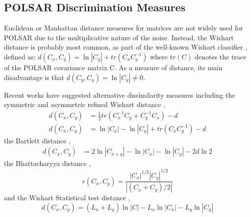 \documentclass[]{tRSL2e}
\begin{document}
\subsection{POLSAR Discrimination Measures}
\label{sec:lit_measures}

Euclidean or Manhattan distance measures for matrices are not widely used 
for POLSAR due to the multiplicative nature of the noise.
Instead, the Wishart distance is probably most common, as part of the well-known Wishart classifier \citep{Lee_1999_TGRS}, defined \citep{Lee_1994_IJRS_2299} as:
$d(C_x,C_y) = \ln|C_y| + tr(C_xC_y^{-1})$
where $tr(C)$ denotes the trace of the POLSAR covariance matrix C. 
As a measure of distance, its main disadvantage is that $d(C_y,C_y) = \ln|C_y| \neq 0$.

Recent works have suggested alternative dissimilarity measures including the symmetric and asymmetric refined Wishart distance \citep{Anfinsen_2007_ESA_POLINSAR},
\vspace{-2mm}
\begin{align}
  d(C_x,C_y) &= \frac{1}{2} tr(C_x^{-1}C_y + C_y^{-1}C_x) - d \\
    d(C_x,C_y) &= \ln|C_x| - \ln|C_y| + tr(C_xC_y^{-1}) - d
\end{align}
\vspace{-2mm}
the Bartlett distance \citep{Kersten_2005_TGRS_519},
     \vspace{-2mm}
  \begin{align}
  d(C_x,C_y) &= 2 \ln |C_{x+y}| - \ln |C_x| - \ln |C_y| - 2d\ln2
  \end{align}
     \vspace{-2mm}
the Bhattacharyya distance \citep{Lee_2011_IGARSS_3740},
     \vspace{-2mm}
\begin{equation}
  r(C_x,C_y) = \frac{|C_x|^{1/2} |C_y|^{1/2}}{|(C_x+C_y)/2|}
\end{equation}
     \vspace{-2mm}
and the Wishart Statistical test distance \citep{Cao_2007_TGRS_3454},
     \vspace{-2mm}
\begin{equation}
  d(C_x,C_y) = (L_x + L_y) \ln|C| - L_x \ln|C_x| - L_y\ln|C_y|
\end{equation}
\end{document}
